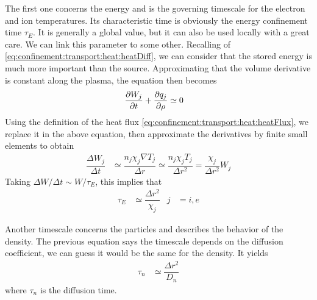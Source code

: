 The first one concerns the energy and is the governing timescale for the electron and ion temperatures. Its characteristic time is obviously the energy confinement time $\tau_E$. It is generally a global value, but it can also be used locally with a great care. We can link this parameter to some other. Recalling of \eqref{eq:confinement:transport:heat:heatDiff}, we can consider that the stored energy is much more important than the source. Approximating that the volume derivative is constant along the plasma, the equation then becomes
\begin{align*}
	\dfrac{\partial W_j}{\partial t} + \dfrac{\partial q_j}{\partial \rho} & \simeq 0
\end{align*}
Using the definition of the heat flux \eqref{eq:confinement:transport:heat:heatFlux}, we replace it in the above equation, then approximate the derivatives by finite small elements to obtain
\begin{align*}
	\dfrac{\Delta W_j}{\Delta t} & \simeq \dfrac{n_j \chi_j \nabla T_j}{\Delta r} \simeq \dfrac{n_j \chi_j T_j}{\Delta r^2} = \dfrac{\chi_j}{\Delta r^2} W_j
\end{align*}
Taking $\Delta W / \Delta t \sim W / \tau_E$, this implies that
\begin{align}
	\tau_E & \simeq \dfrac{\Delta r^2}{\chi_j} & j & = i, e                                                                 \label{eq:confinement:transport:taus:tauE}
\end{align}

Another timescale concerns the particles and describes the behavior of the density. The previous equation says the timescale depends on the diffusion coefficient, we can guess it would be the same for the density. It yields
\begin{align}
	\tau_n & \simeq \dfrac{\Delta r^2}{D_n}   \label{eq:confinement:transport:taus:taun}
\end{align}
where $\tau_n$ is the diffusion time.%

